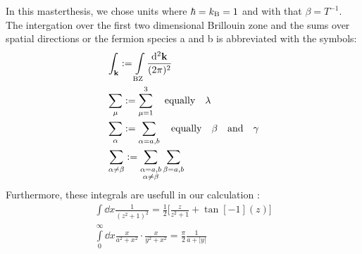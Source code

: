 In this masterthesis, we chose units where $\hbar = k_{\mathrm{B}} = 1$ and with that $\beta = T^{-1}$.
The intergation over the first two dimensional Brillouin zone and the sums over spatial directions or the fermion species a and b is abbreviated with the symbols:
%
\begin{align}
	&\int_{\vb{k}} := \int\limits_{\mt{BZ}} \frac{\dd[2]{\vb{k}}}{(2\pi)^{2}}
	\\
	&\sum\limits_{\mu} := \sum\limits_{\mu = 1}^{3} \qq{equally} \lambda
	\\
	&\sum\limits_{\alpha} := \sum\limits_{\alpha = a,b} \qq{equally} \beta \qq{and} \gamma
	\\
	&\sum\limits_{\alpha\neq\beta} := \sum\limits_{\substack{\alpha = a,b \\ \alpha\neq\beta}} \sum_{\beta = a,b}
\end{align}
%
Furthermore, these integrals are usefull in our calculation \cite{Bronstein}:
%
\begin{align}
	\int \dd{x} \frac{1}{(z^{2} + 1)^{2}} = \frac{1}{2}\Big[\frac{z}{z^2 + 1} + \tan[-1](z)\Big]
	\label{eq:integral1}
	\\
	\int\limits_{0}^{\infty} \dd{x} \frac{x}{a^{2} + x^{2}} \cdot \frac{x}{y^{2} + x^{2}} = \frac{\pi}{2} \frac{1}{a + |y|}
	\label{eq:integral2}
\end{align}
%